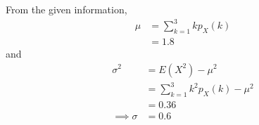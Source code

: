 From the given information,
%
\begin{align}
    \mu&= \sum_{k=1}^3 k p_X(k)\\
    &=1.8
\end{align}
and 
\begin{align}
    \sigma^2 &= E(X^2) -\mu^2\\
    &= \sum_{k=1}^3 k^2 p_X(k) - \mu^2\\
    &= 0.36 \\
    \implies 
    \sigma &= 0.6
\end{align}